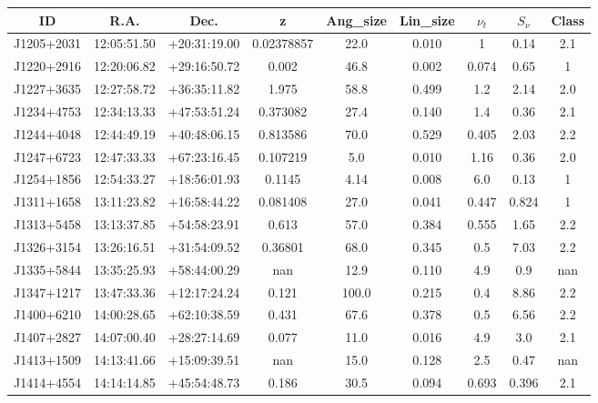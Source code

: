 \begin{table}[H]
\begin{tabular}{@{}ccccccccc@{}}
        \bottomrule
    \end{tabular}
\end{table}

\begin{table}
    \centering
    \begin{tabular}{@{}ccccccccc@{}}
        \toprule
        ID & R.A. & Dec. & z & Ang\_size & Lin\_size & $\nu_t$ & $S_\nu$ & Class \\ \midrule
        J1205+2031 & 12:05:51.50 & +20:31:19.00 & 0.02378857 & 22.0 & 0.010 & 1 & 0.14 & 2.1 \\
        J1220+2916 & 12:20:06.82 & +29:16:50.72 & 0.002 & 46.8 & 0.002 & 0.074 & 0.65 & 1 \\
        J1227+3635 & 12:27:58.72 & +36:35:11.82 & 1.975 & 58.8 & 0.499 & 1.2 & 2.14 & 2.0 \\
        J1234+4753 & 12:34:13.33 & +47:53:51.24 & 0.373082 & 27.4 & 0.140 & 1.4 & 0.36 & 2.1 \\
        J1244+4048 & 12:44:49.19 & +40:48:06.15 & 0.813586 & 70.0 & 0.529 & 0.405 & 2.03 & 2.2 \\
        J1247+6723 & 12:47:33.33 & +67:23:16.45 & 0.107219 & 5.0 & 0.010 & 1.16 & 0.36 & 2.0 \\
        J1254+1856 & 12:54:33.27 & +18:56:01.93 & 0.1145 & 4.14 & 0.008 & 6.0 & 0.13 & 1 \\
        J1311+1658 & 13:11:23.82 & +16:58:44.22 & 0.081408 & 27.0 & 0.041 & 0.447 & 0.824 & 1 \\
        J1313+5458 & 13:13:37.85 & +54:58:23.91 & 0.613 & 57.0 & 0.384 & 0.555 & 1.65 & 2.2 \\
        J1326+3154 & 13:26:16.51 & +31:54:09.52 & 0.36801 & 68.0 & 0.345 & 0.5 & 7.03 & 2.2 \\
        J1335+5844 & 13:35:25.93 & +58:44:00.29 & nan & 12.9 & 0.110 & 4.9 & 0.9 & nan \\
        J1347+1217 & 13:47:33.36 & +12:17:24.24 & 0.121 & 100.0 & 0.215 & 0.4 & 8.86 & 2.2 \\
        J1400+6210 & 14:00:28.65 & +62:10:38.59 & 0.431 & 67.6 & 0.378 & 0.5 & 6.56 & 2.2 \\
        J1407+2827 & 14:07:00.40 & +28:27:14.69 & 0.077 & 11.0 & 0.016 & 4.9 & 3.0 & 2.1 \\
        J1413+1509 & 14:13:41.66 & +15:09:39.51 & nan & 15.0 & 0.128 & 2.5 & 0.47 & nan \\
        J1414+4554 & 14:14:14.85 & +45:54:48.73 & 0.186 & 30.5 & 0.094 & 0.693 & 0.396 & 2.1 \\

\end{tabular}
\end{table}

